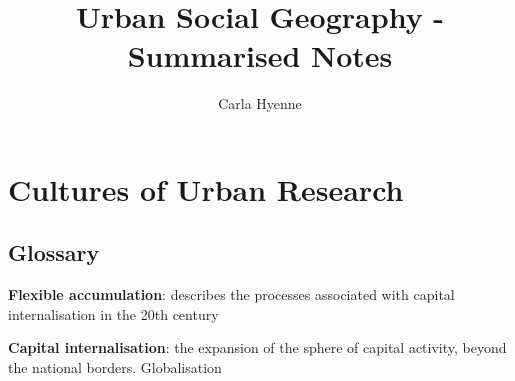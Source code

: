 \documentclass{article}
\title{Urban Social Geography - Summarised Notes}
\author{Carla Hyenne }
\begin{document}
\maketitle

\tableofcontents

\pagebreak

\section{Cultures of Urban Research}

\subsection{Glossary}

\textbf{Flexible accumulation}: describes the processes associated with capital internalisation in the 20th century

\textbf{Capital internalisation}: the expansion of the sphere of capital activity, beyond the national borders. Globalisation
\end{document}
